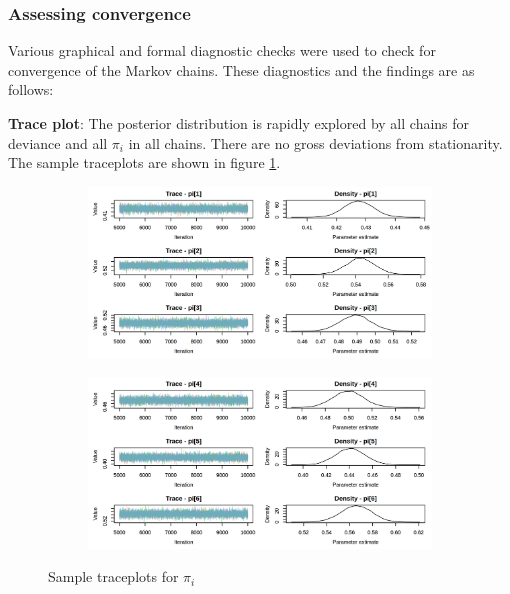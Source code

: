 \documentclass[12pt]{article}
\begin{document}
\subsubsection{Assessing convergence}

Various graphical and formal diagnostic checks were used to check for convergence of the Markov chains. These diagnostics and the findings are as follows:

\textbf{Trace plot}: The posterior distribution is rapidly explored by all chains for deviance and all $\pi_i$ in all chains. There are no gross deviations from stationarity. The sample traceplots are shown in figure \ref{fig:traceplotsm1}.

\begin{figure}[h!]
    \centering
    \begin{subfigure}{0.45\textwidth}
        \includegraphics[width=\linewidth]{pictures/traceplot1-3.png}
    \end{subfigure}
    \begin{subfigure}{0.45\textwidth}
        \includegraphics[width=\linewidth]{pictures/traceplot4-6.png}
    \end{subfigure}
    
    \caption{Sample traceplots for $\pi_i$}
    \label{fig:traceplotsm1}
\end{figure}
\end{document}
